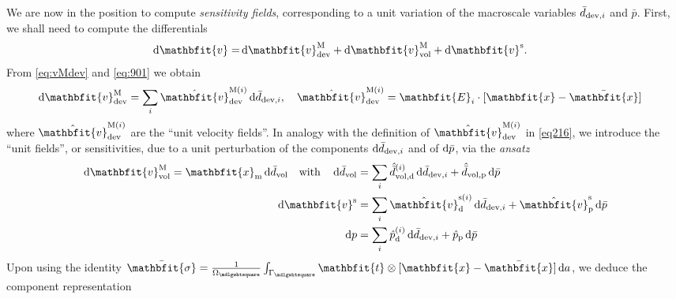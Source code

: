 \documentclass[10pt,a4paper,fleqn]{article}
\renewcommand{\ta}[1]{\mathbfit{#1}}
\renewcommand{\ts}[1]{\mathbfit{#1}}
\renewcommand{\Box}{\mdlgwhtsquare}
\newcommand{\ded}{\mathrm{d}}
\newcommand{\dep}{\mathrm{p}}
\begin{document}
We are now in the position to compute \emph{sensitivity fields}, corresponding to a unit variation of the macroscale variables $\bar{d}_{\mathrm{dev},i}$ and $\bar{p}$. First, we shall need to compute the differentials
\begin{align}
    \dif\ta{v}
     = &
    \dif\ta{v}^\macro_\dev + \dif\ta{v}^\macro_\vol + \dif\ta{v}^\fluct.
\label{eq:dv}
\end{align}
From \eqref{eq:vMdev} and \eqref{eq:901} we obtain
\begin{align}
  \dif \ta{v}^{\macro}_\dev &= \sum_{i} \hat{\ta{v}}^{\macro(i)}_\dev \dif\bar{d}_{\dev,i}, \quad  \hat{\ta{v}}^{\macro(i)}_\dev = \ts E_i \cdot [\ta x - \bar{\ta x}]
\label{eq216}
\end{align}
where $\hat{\ta{v}}^{\macro(i)}_\dev$ are the ``unit velocity fields''.
In analogy with the definition of $\hat{\ta{v}}^{\macro(i)}_\dev$
in \eqref{eq216}, we introduce the ``unit fields'', or sensitivities, due to a unit perturbation of the components $\operatorname{d \!}\bar{d}_{\mathrm{dev},i}$ and of $\operatorname{d \!}\bar{p}$, via the \emph{ansatz}
\begin{align}
    \dif\ta{v}^\macro_\vol = \ta x_\mean \dif \bar{d}_\vol \quad\mbox{with}\quad
    \dif\bar{d}_\vol &= \sum_i \hat{\bar{d}}_{\vol,\ded}^{(i)}\dif\bar{d}_{\dev,i} + \hat{\bar{d}}_{\vol,\dep} \dif \bar{p}
\\
    \dif\ta v^\fluct &= \sum_i \hat{\ta{v}}_{\ded}^{\fluct(i)}\dif\bar{d}_{\dev,i} + \hat{\ta v}_{\dep}^\fluct \dif \bar{p}
\\
    \dif p           &= \sum_i \hat{p}_{\ded}^{(i)}\dif\bar{d}_{\dev,i} + \hat{p}_{\dep} \dif \bar{p}
\end{align}
Upon using the identity $\bar{\ts\sigma}=\frac{1}{\Omega_\Box} \int_{\Gamma_\Box} \ts t \outerp [\ta x - \bar{\ta x}]\dif a$, we deduce the component representation
\end{document}
